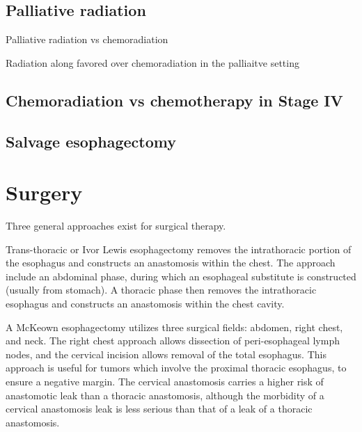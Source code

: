 \documentclass[
]{book}
\begin{document}
\hypertarget{palliative-radiation}{%
\section{Palliative radiation}\label{palliative-radiation}}

Palliative radiation vs chemoradiation \citep{penniment114}

Radiation along favored over chemoradiation in the palliaitve setting \citep{penniment114}

\hypertarget{chemoradiation-vs-chemotherapy-in-stage-iv}{%
\section{Chemoradiation vs chemotherapy in Stage IV}\label{chemoradiation-vs-chemotherapy-in-stage-iv}}

\citep{guttman1134}

\hypertarget{salvage-esophagectomy}{%
\section{Salvage esophagectomy}\label{salvage-esophagectomy}}

\citep{markar922}

\hypertarget{surgery-1}{%
\chapter{Surgery}\label{surgery-1}}

Three general approaches exist for surgical therapy.

Trans-thoracic or Ivor Lewis esophagectomy\citep{visbal1803} removes the intrathoracic portion of the esophagus and constructs an anastomosis within the chest. The approach include an abdominal phase, during which an esophageal substitute is constructed (usually from stomach). A thoracic phase then removes the intrathoracic esophagus and constructs an anastomosis within the chest cavity.

A McKeown esophagectomy utilizes three surgical fields: abdomen, right chest, and neck. The right chest approach allows dissection of peri-esophageal lymph nodes, and the cervical incision allows removal of the total esophagus.\citep{mckeown259} This approach is useful for tumors which involve the proximal thoracic esophagus, to ensure a negative margin. The cervical anastomosis carries a higher risk of anastomotic leak than a thoracic anastomosis, although the morbidity of a cervical anastomosis leak is less serious than that of a leak of a thoracic anastomosis.
\end{document}
